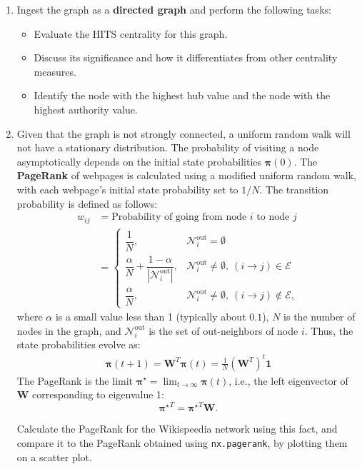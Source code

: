 \documentclass{article}
\begin{document}
\begin{enumerate}[leftmargin=1.5em]
\item Ingest the graph as a \textbf{directed graph} and perform the following tasks:
    \begin{itemize}[leftmargin=1.5em]
        \item Evaluate the HITS centrality for this graph.
        \item Discuss its significance and how it differentiates from other centrality measures.
        \item Identify the node with the highest hub value and the node with the highest authority value.
    \end{itemize}
\item Given that the graph is not strongly connected, a uniform random walk will not have a stationary distribution. The probability of visiting a node asymptotically depends on the initial state probabilities $\bm{\pi}(0)$. The \textbf{PageRank} of webpages is calculated using a modified uniform random walk, with each webpage's initial state probability set to $1/N$. The transition probability is defined as follows:
\begin{align*}
  w_{ij} &= \text{Probability of going from node $i$ to node $j$}\\
  &= \begin{cases}
  \dfrac{1}{N},  & \mathcal{N}^{\mathrm{out}}_i = \emptyset\\[0.5em]
  \dfrac{\alpha}{N} + \dfrac{1-\alpha}{|\mathcal{N}^{\mathrm{out}}_i|}, & \mathcal{N}^{\mathrm{out}}_i \ne \emptyset,\ (i \rightarrow j) \in \mathcal{E}\\[0.5em]
  \dfrac{\alpha}{N}, & \mathcal{N}^{\mathrm{out}}_i \ne \emptyset,\ (i \rightarrow j) \notin \mathcal{E},
  \end{cases}
\end{align*}
where $\alpha$ is a small value less than 1 (typically about $0.1$), $N$ is the number of nodes in the graph, and $\mathcal{N}_i^{\mathrm{out}}$ is the set of out-neighbors of node $i$. Thus, the state probabilities evolve as:
\begin{align*}
  \bm{\pi}(t+1) = \bm{W}^T\bm{\pi}(t) = \frac{1}{N}\left(\bm{W}^T\right)^t\bm{1}
\end{align*}
The PageRank is the limit $\bm{\pi}^\star = \lim_{t\to\infty}\bm{\pi}(t)$, i.e., the left eigenvector of $\bm{W}$ corresponding to eigenvalue 1:
\[
  {\bm{\pi}^\star}^T = {\bm{\pi}^\star}^T \bm{W}.
\]

\noindent Calculate the PageRank for the Wikispeedia network using this fact, and compare it to the PageRank obtained using \texttt{nx.pagerank}, by plotting them on a scatter plot.
\end{enumerate}
\end{document}
